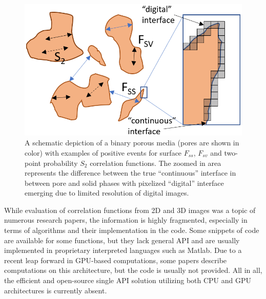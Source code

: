 \documentclass[reprint,amsmath,amssymb,aps,pre,showkeys,showpacs,nofootinbib]{revtex4-1}
\begin{document}
\begin{figure}[ht]
  \centering
  \includegraphics[width=0.9\linewidth]{images/corr.png}
  \caption[]{A schematic depiction of a binary porous media (pores are shown in
    color) with examples of positive events for surface $F_{ss}$, $F_{sv}$ and
    two-point probability $S_2$ correlation functions. The zoomed in area
    represents the difference between the true ``continuous'' interface in
    between pore and solid phases with pixelized ``digital'' interface emerging
    due to limited resolution of digital images.}
  \label{fig:functions}
\end{figure}

While evaluation of correlation functions from 2D and 3D images was a topic of
numerous research papers, the information is highly fragmented, especially in
terms of algorithms and their implementation in the code. Some snippets of code
are available for some functions, but they lack general API and are usually
implemented in proprietary interpreted languages such as Matlab. Due to a recent
leap forward in GPU-based computations, some papers describe computations on
this architecture, but the code is usually not provided. All in all, the
efficient and open-source single API solution utilizing both CPU and GPU
architectures is currently absent.
\end{document}
